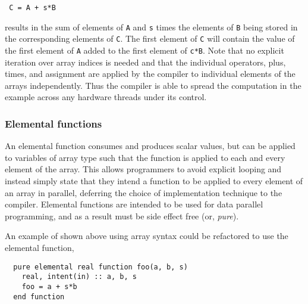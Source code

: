 {\small
\begin{verbatim}
 C = A + s*B
\end{verbatim}
}

results in the sum of elements of {\tt A} and {\tt s} times the elements of
{\tt B} being stored in the corresponding elements of {\tt C}. The first
element of {\tt C} will contain the value of the first element of {\tt A}
added to the first element of {\tt c*B}.  Note that no explicit iteration over
array indices is needed and that the individual operators, plus, times, and
assignment are applied by the compiler to individual elements of the arrays
independently.  Thus the compiler is able to spread the computation in the
example across any hardware threads under its control.


\subsubsection*{Elemental functions}

An elemental function consumes and produces scalar values, but can be applied
to variables of array type such that the function is applied to each and every
element of the array.  This allows programmers to avoid explicit looping and
instead simply state that they intend a function to be applied to every
element of an array in parallel, deferring the choice of implementation
technique to the compiler.  Elemental functions are intended to be used for
data parallel programming, and as a result must be side effect free (or,
\emph{pure}).


An example of shown above using array syntax could be refactored to use
the elemental function,

{\small
\begin{verbatim}
  pure elemental real function foo(a, b, s)
    real, intent(in) :: a, b, s
    foo = a + s*b
  end function
\end{verbatim}
}

